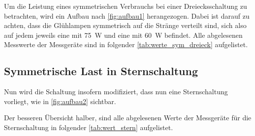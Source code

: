 \documentclass[12pt,english,ngerman]{scrartcl}
\begin{document}
Um die Leistung eines symmetrischen Verbrauchs bei einer Dreiecksschaltung zu
betrachten, wird ein Aufbau nach \autoref{fig:aufbau1} herangezogen. Dabei ist
darauf zu achten, dass die Glühlampen symmetrisch auf die Stränge verteilt
sind, sich also auf jedem jeweils eine mit \SI[]{75}{\watt} und eine mit
\SI[]{60}{\watt} befindet. Alle abgelesenen Messwerte der Messgeräte sind in
folgender \autoref{tab:werte_sym_dreieck} aufgelistet.

\begin{table}[H]
	\caption[Abgelesene Werte bei symmetrischer Belastung in Dreiecksschaltung] {Abgelesene
		Werte bei symmetrischer Belastung in Dreiecksschaltung                     \\
		$I_i \dots$ gemessener Strom am i-ten Strang in A                          \\
		$I_{31} \dots$ gemessener Strom zwischen Sternpunkt und Neutralleiter in A \\
		$U_{ij} \dots$ gemessene Spannung zwischen den Strängen i und j in V       \\
		$P_{i}^M \dots$ gemessene Wirkleistungen in W (für genaue Bezeichnung siehe \autoref{fig:aufbau1})
	}\label{tab:werte_sym_dreieck}
	\centering
	
	
\end{table}

\subsection{Symmetrische Last in Sternschaltung}

Nun wird die Schaltung insofern modifiziert, dass nun eine Sternschaltung
vorliegt, wie in \autoref{fig:aufbau2} sichtbar.

Der besseren Übersicht halber, sind alle abgelesenen Werte der Messgeräte für
die Sternschaltung in folgender \autoref{tab:wert_stern} aufgelistet.

\begin{table}[H]
	\caption[Abgelesene Werte bei Sternschaltung] {Abgelesene Werte bei Sternschaltung                                        \\
		1. Zeile \dots symmetrische Belastung                                      \\
		2. Zeile \dots asymmetrische Belastung                                     \\
		3. Zeile \dots asymmetrische Belastung mit simulierten Kabelbruch          \\
		$I_i \dots$ gemessener Strom am i-ten Strang in A                          \\
		$I_{31} \dots$ gemessener Strom zwischen Sternpunkt und Neutralleiter in A \\
		$U_{i} \dots$ gemessene Spannung am i-ten Strang in V                      \\
		$P_{i}^M \dots$ gemessene Wirkleistungen in W (für genaue Bezeichnung siehe \autoref{fig:aufbau2})
	}\label{tab:wert_stern}
	\centering
	
	
\end{table}
\end{document}
